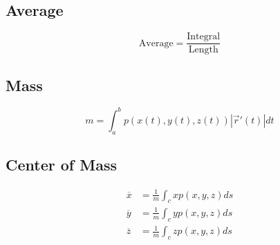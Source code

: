   \subsection{Average}

    \begin{equation}
      \text{Average} = \frac{\text{Integral}}{\text{Length}}
    \end{equation}

  \subsection{Mass}

    \begin{equation}
      m = \int_{a}^{b} p
      \left(
        x\left( t \right),
        y\left( t \right),
        z\left( t \right)
      \right) \left| \vec{r}'(t) \right| dt
    \end{equation}

  \subsection{Center of Mass}

    \begin{align}
      \overline{x} &= \frac{1}{m} \int_{c} x p\left( x, y, z \right) ds \\
      \overline{y} &= \frac{1}{m} \int_{c} y p\left( x, y, z \right) ds \\
      \overline{z} &= \frac{1}{m} \int_{c} z p\left( x, y, z \right) ds
    \end{align}